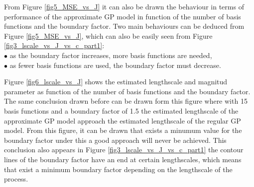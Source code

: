 \documentclass[]{interact}
\theoremstyle{plain}%
\theoremstyle{definition}
\theoremstyle{remark}
\begin{document}
From Figure \ref{fig5_MSE_vs_J} it can also be drawn the behaviour in terms of performance of the approximate GP model in function of the number of basis functions and the boundary factor. Two main behaviours can be deduced from Figure \ref{fig5_MSE_vs_J}, which can also be easily seen from Figure \ref{fig3_lscale_vs_J_vs_c_part1}:
\\ 
$\bullet$ as the boundary factor increases, more basis functions are needed,
\\
$\bullet$ as fewer basis functions are used, the boundary factor must decrease.  

Figure \ref{fig6_lscale_vs_J} shows the estimated lengthscale and magnitud parameter as function of the number of basis functions and the boundary factor. The same conclusion drawn before can be drawn form this figure where with 15 basis functions and a boundary factor of 1.5 the estimated lengthscale of the approximate GP model approach the estimated lengthscale of the regular GP model. From this figure, it can be drawn that exists a minumum value for the boundary factor under this a good approach will never be achieved. This conclusion also appears in Figure \ref{fig3_lscale_vs_J_vs_c_part1} the contour lines of the boundary factor have an end at certain lengthscales, which means that exist a minimum boundary factor depending on the lengthscale of the process. 
\end{document}
